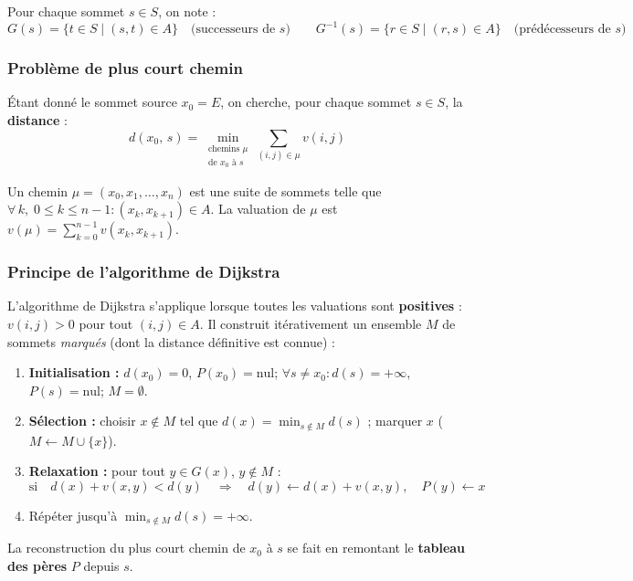 \documentclass[12pt,a4paper]{article}
\begin{document}
Pour chaque sommet $s \in S$, on note :
\[
G(s) = \{t \in S \mid (s,t) \in A\} \quad \text{(successeurs de }s\text{)}
\qquad
G^{-1}(s) = \{r \in S \mid (r,s) \in A\} \quad \text{(prédécesseurs de }s\text{)}
\]

\subsubsection{Problème de plus court chemin}

Étant donné le sommet source $x_0 = E$, on cherche, pour chaque sommet $s \in S$,
la \textbf{distance} :
\[
d(x_0,\, s) = \min_{\substack{\text{chemins } \mu \\ \text{de } x_0 \text{ à } s}}
\sum_{(i,j)\in\mu} v(i,j)
\]

Un chemin $\mu = (x_0, x_1, \ldots, x_n)$ est une suite de sommets telle que
$\forall\, k,\; 0 \le k \le n-1 : (x_k, x_{k+1}) \in A$.
La valuation de $\mu$ est $v(\mu) = \sum_{k=0}^{n-1} v(x_k, x_{k+1})$.

\subsubsection{Principe de l'algorithme de Dijkstra}

L'algorithme de Dijkstra s'applique lorsque toutes les valuations sont
\textbf{positives} : $v(i,j) > 0$ pour tout $(i,j)\in A$.
Il construit itérativement un ensemble $M$ de sommets \emph{marqués} (dont la distance
définitive est connue) :

\begin{enumerate}[noitemsep]
  \item \textbf{Initialisation :} $d(x_0)=0$,\; $P(x_0)=\text{nul}$;\;
        $\forall s\neq x_0 : d(s)=+\infty$,\; $P(s)=\text{nul}$;\; $M=\emptyset$.
  \item \textbf{Sélection :} choisir $x\notin M$ tel que $d(x) = \min_{s\notin M} d(s)$
        ; marquer $x$ ($M \leftarrow M \cup \{x\}$).
  \item \textbf{Relaxation :} pour tout $y \in G(x)$, $y \notin M$ :
        \[
          \text{si}\quad d(x)+v(x,y) < d(y) \quad \Rightarrow \quad
          d(y) \leftarrow d(x)+v(x,y),\quad P(y) \leftarrow x
        \]
  \item Répéter jusqu'à $\min_{s\notin M} d(s) = +\infty$.
\end{enumerate}

La reconstruction du plus court chemin de $x_0$ à $s$ se fait en remontant le
\textbf{tableau des pères} $P$ depuis $s$.
\end{document}
